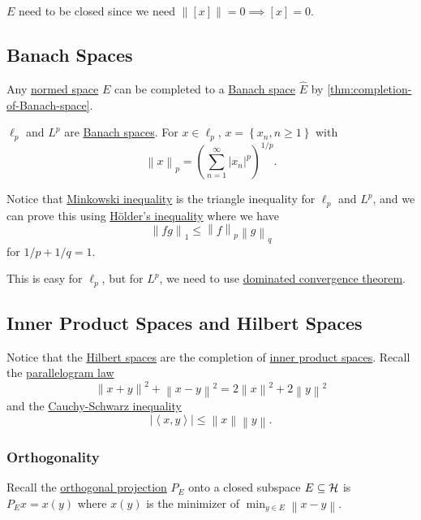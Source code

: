 \begin{remark}
	\(E\) need to be closed since we need \(\left\lVert [x]\right\rVert = 0 \implies [x] = 0\).
\end{remark}

\subsection{Banach Spaces}
Any \hyperref[def:normed-vector-space]{normed space} \(E\) can be completed to a \hyperref[def:Banach-space]{Banach space} \(\hat{E} \) by \autoref{thm:completion-of-Banach-space}.

\begin{eg}
	\(\ell _p\) and \(L^p\) are \hyperref[def:Banach-space]{Banach spaces}. For \(x\in \ell _p\), \(x= \left\{ x_n, n\geq 1 \right\} \) with
	\[
		\left\lVert x\right\rVert _p = \left( \sum_{n=1} ^{\infty} \left\vert x_n \right\vert ^p \right) ^{1 / p}.
	\]
\end{eg}

Notice that \hyperref[lma:Minkowski-ineq]{Minkowski inequality} is the triangle inequality for \(\ell _p\) and \(L^p\), and we can prove this using \hyperref[lma:Holder-ineq]{Hölder's inequality} where we have
\[
	\left\lVert fg\right\rVert _1 \leq \left\lVert f\right\rVert _p \left\lVert g\right\rVert _q
\]
for \(1 / p + 1 / q = 1\).

\begin{remark}
	This is easy for \(\ell _p\), but for \(L^p\), we need to use \href{https://en.wikipedia.org/wiki/Dominated_convergence_theorem}{dominated convergence theorem}.
\end{remark}

\subsection{Inner Product Spaces and Hilbert Spaces}
Notice that the \hyperref[def:Hilbert-space]{Hilbert spaces} are the completion of \hyperref[def:inner-product-space]{inner product spaces}. Recall the \hyperref[lma:parallelogram-law]{parallelogram law}
\[
	\left\lVert x + y\right\rVert ^{2} + \left\lVert x - y\right\rVert ^{2} = 2\left\lVert x\right\rVert ^{2} + 2 \left\lVert y\right\rVert ^{2}
\]
and the \hyperref[thm:Cauchy-Schwarz-ineq]{Cauchy-Schwarz inequality}
\[
	\left\vert \left\langle x, y \right\rangle  \right\vert \leq \left\lVert x\right\rVert \left\lVert y\right\rVert.
\]

\subsubsection{Orthogonality}
Recall the \hyperref[def:orthogonal-projection]{orthogonal projection} \(P_E\) onto a closed subspace \(E \subseteq \mathcal{\MakeUppercase{h}} \) is \(P_E x = x(y)\) where \(x(y)\) is the minimizer of \(\min _{y\in E} \left\lVert x - y\right\rVert \).

